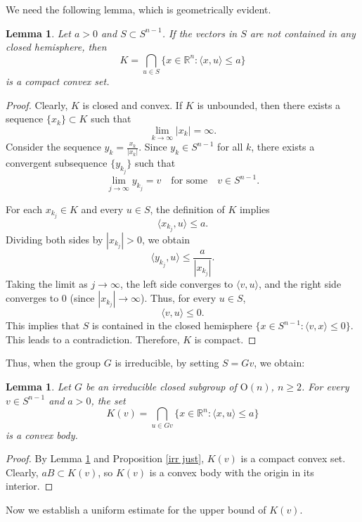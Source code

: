 \documentclass[12pt, reqno]{amsart}
\newtheorem{lemma}[theorem]{Lemma}
\theoremstyle{definition}
\theoremstyle{remark}
\numberwithin{equation}{section}
\newcommand{\Sn}{S^{n-1}}
\newcommand{\On}{\mathrm{O}(n)}
\begin{document}
	We need the following lemma, which is geometrically evident.
	

\begin{lemma}\label{Sbound}
	Let \( a > 0 \) and \( S \subset \Sn \). If the vectors in \( S \) are not contained in any closed hemisphere, then
		\[
	K = \bigcap_{u \in S} \{ x \in \mathbb{R}^n : \langle x, u \rangle \leq a \}
	\]
	is a compact convex set.
\end{lemma}
	
	\begin{proof}
	Clearly, $K$ is closed and convex. If $K$ is unbounded, then there exists a sequence $\{x_k\} \subset K$ such that 
	\[
	\lim_{k \to \infty} |x_k| = \infty.
	\]
	Consider the sequence $y_k = \frac{x_k}{|x_k|}$. Since $y_k \in \Sn$ for all $k$,  there exists a convergent subsequence $\{y_{k_j}\}$ such that 
	\[
	\lim_{j \to \infty} y_{k_j} = v \quad \text{for some} \quad v \in S^{n-1}.
	\]
	
	For each $x_{k_j} \in K$ and every $u \in S$, the definition of $K$ implies 
	\[
	\langle x_{k_j}, u \rangle \leq a.
	\]
	Dividing both sides by $|x_{k_j}| > 0$, we obtain 
	\[
	\langle y_{k_j}, u \rangle \leq \frac{a}{|x_{k_j}|}.
	\]
	Taking the limit as $j \to \infty$, the left side converges to $\langle v, u \rangle$, and the right side converges to $0$ (since $|x_{k_j}| \to \infty$). Thus, for every $u \in S$,
	\[
	\langle v, u \rangle \leq 0.
	\]
	This implies that $S$ is contained in the closed hemisphere $\{ x \in S^{n-1} : \langle v, x \rangle \leq 0 \}$. This leads to a contradiction. Therefore, $K$ is compact.
	\end{proof}
	
	Thus,  when the group $G$ is irreducible, by setting $S = Gv$, we obtain:
	\begin{lemma}\label{Kv convex}
			Let $G$ be an irreducible closed subgroup of $\On$, $n\ge2$. For every  $v \in S^{n-1}$ and \( a > 0 \), the set
		\[
		K(v) = \bigcap_{u \in Gv} \{ x \in \mathbb{R}^n : \langle x, u \rangle \leq a \}
		\]
		is a convex body.
	\end{lemma}
	
	\begin{proof}
	By	Lemma \ref{Sbound} and Proposition \ref{irr just},  $K(v)$ is a compact convex set.  Clearly, $aB\subset K(v)$, so $K(v)$ is a convex body  with the origin in its interior.
	\end{proof}
	
		 Now we establish a uniform estimate for the upper bound of $K(v)$.
	
\end{document}
